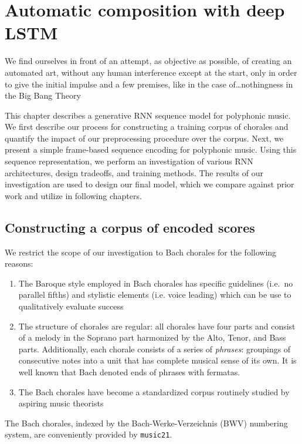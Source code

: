 \chapter{Automatic composition with deep LSTM}
\begin{savequote}[75mm]
  We find ourselves in front of an attempt, as objective as possible, of creating
  an automated art, without any human interference except at the start, only in
  order to give the initial impulse and a few premises, like in the case
  of\ldots nothingness in the Big Bang Theory
\end{savequote}
\ifpdf
    \graphicspath{{Chapter4/Figs/Raster/}{Chapter4/Figs/PDF/}{Chapter4/Figs/}}
\else
    \graphicspath{{Chapter4/Figs/Vector/}{Chapter4/Figs/}}
\fi


This chapter describes a generative RNN sequence model for polyphonic music. We
first describe our process for constructing a training corpus of chorales and
quantify the impact of our preprocessing procedure over the corpus. Next, we
present a simple frame-based sequence encoding for polyphonic music. Using this
sequence representation, we perform an investigation of various RNN
architectures, design tradeoffs, and training methods. The results of our
investigation are used to design our final model, which we compare against
prior work and utilize in following chapters.

\section{Constructing a corpus of encoded scores}

We restrict the scope of our investigation to Bach chorales for the following reasons:
\begin{enumerate}
  \item The Baroque style employed in Bach chorales has specific guidelines
    \citep{piston1978harmony} (i.e.\ no parallel fifths) and stylistic elements
    (i.e. voice leading) which can be use to qualitatively evaluate success
  \item The structure of chorales are regular: all chorales have four parts and
    consist of a melody in the Soprano part harmonized by the Alto, Tenor, and
    Bass parts. Additionally, each chorale consists of a series of \emph{phrases}:
    groupings of consecutive notes into a unit that has complete musical sense
    of its own\citep{nattiez1990music}. It is well known that Bach
    denoted ends of phrases with fermatas.
  \item The Bach chorales have become a standardized corpus routinely studied
    by aspiring music theorists\citep{white2002guidelines}
\end{enumerate}
The Bach chorales, indexed by the Bach-Werke-Verzeichnis (BWV) numbering
system\citep{butt1999bach}, are conveniently provided by
\texttt{music21}\citep{Scott2015}.

